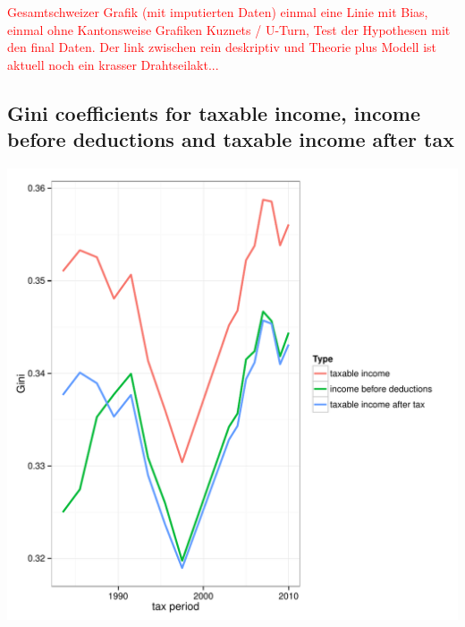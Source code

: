 \documentclass[twoside]{article}\usepackage[]{graphicx}\usepackage[]{color}
\makeatletter
\def\maxwidth{ %
  \ifdim\Gin@nat@width>\linewidth
    \linewidth
  \else
    \Gin@nat@width
  \fi
}
\newenvironment{knitrout}{}{} %
\makeatother
\begin{document}
\begin{multicols}{2}
\textcolor{red}{Gesamtschweizer Grafik (mit imputierten Daten) einmal eine Linie mit Bias, einmal ohne
Kantonsweise Grafiken
Kuznets / U-Turn, Test der Hypothesen mit den final Daten. Der link zwischen rein deskriptiv  und Theorie plus Modell ist aktuell noch ein krasser Drahtseilakt...}

\subsection{Gini coefficients for taxable income, income before deductions and taxable income after tax}




\begin{knitrout}
\color{fgcolor}
\includegraphics[width=\maxwidth]{figure/different_ginis1} 


\end{knitrout}
\end{multicols}
\end{document}
